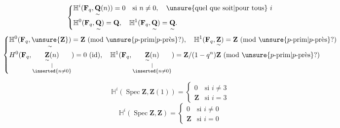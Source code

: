 \[
\left\{\begin{aligned}
&\mathbb H^i(\mathbf F_q,\underset{\sim}{\mathbf Q}(n))=0\quad\text{si }n\neq0,\quad\text{\unsure{quel que soit|pour tous} }i\\
&\mathbb H^0(\mathbf F_q,\underset{\sim}{\mathbf Q})=\mathbf Q,\quad\mathbb H^1(\mathbf F_q,\underset{\sim}{\mathbf Q})=\underset{\sim}{\mathbf Q}.
\end{aligned}\right.
\]
\[
\left\{\begin{aligned}
&\mathbb H^0(\mathbf F_q,\underset{\sim}{\unsure{\mathbf Z}})=\mathbf Z\ (\text{mod }\unsure{p\text{-prim}|p\text{-près}}?),\quad
\mathbb H^1(\mathbf F_q,\underset{\sim}{\mathbf Z})=\mathbf Z\ (\text{mod }\unsure{p\text{-prim}|p\text{-près}}?)\\
&H^0(\mathbf F_q,\underset{\substack{\vert\\\inserted{n\neq0}}}{\underset{\sim}{\mathbf Z}(n)})=0\ (\text{id}),\quad
\mathbb H^1(\mathbf F_q,\underset{\substack{\vert\\\inserted{n\neq0}}}{\underset{\sim}{\mathbf Z}(n)})=\mathbf Z/(1-q^n)\mathbf Z\ (\text{mod }\unsure{p\text{-prim}|p\text{-près}}?)
\end{aligned}\right.
\]


\[
\mathbb H^i(\operatorname{Spec}\mathbf Z,\mathbf Z(1))=\begin{cases}0&\text{si }i\neq3\\\mathbf Z&\text{si }i=3\end{cases}
\]
\[
\mathbb H^i(\operatorname{Spec}\mathbf Z,\mathbf Z)=\begin{cases}0&\text{si }i\neq0\\\mathbf Z&\text{si }i=0\end{cases}
\]

